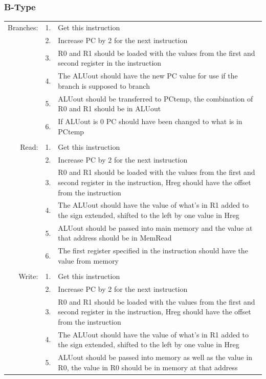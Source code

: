 \documentclass{article}
\begin{document}
		\subsubsection{B-Type}
			\begin{longtable}{ r  r  p{13cm} }
				Branches: & 1. & Get this instruction\\
				          & 2. & Increase PC by 2 for the next instruction\\
				          & 3. & R0 and R1 should be loaded with the values from the first and second register in the instruction\\
				          & 4. & The ALUout should have the new PC value for use if the branch is supposed to branch\\
				          & 5. & ALUout should be transferred to PCtemp, the combination of R0 and R1 should be in ALUout\\
				          & 6. & If ALUout is 0 PC should have been changed to what is in PCtemp\\
				          &    & \\
				Read:     & 1. & Get this instruction\\
				          & 2. & Increase PC by 2 for the next instruction\\
				          & 3. & R0 and R1 should be loaded with the values from the first and second register in the instruction, Hreg should have the offset from the instruction\\
				          & 4. & The ALUout should have the value of what's in R1 added to the sign extended, shifted to the left by one value in Hreg\\
				          & 5. & ALUout should be passed into main memory and the value at that address should be in MemRead\\
				          & 6. & The first register specified in the instruction should have the value from memory\\
				          &    & \\
				Write:    & 1. & Get this instruction\\
				          & 2. & Increase PC by 2 for the next instruction\\
				          & 3. & R0 and R1 should be loaded with the values from the first and second register in the instruction, Hreg should have the offset from the instruction\\
				          & 4. & The ALUout should have the value of what's in R1 added to the sign extended, shifted to the left by one value in Hreg\\
				          & 5. & ALUout should be passed into memory as well as the value in R0, the value in R0 should be in memory at that address
			\end{longtable}
\end{document}
